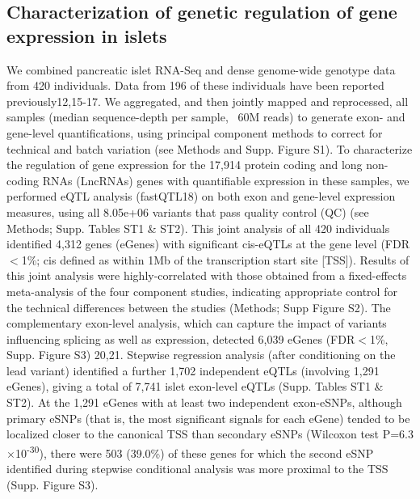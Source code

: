 \subsection{Characterization of genetic regulation of gene expression in islets}
We combined pancreatic islet RNA-Seq and dense genome-wide genotype data from 420 individuals. Data from 196 of these individuals have been reported previously12,15-17. We aggregated, and then jointly mapped and reprocessed, all samples (median sequence-depth per sample, ~60M reads) to generate exon- and gene-level quantifications, using principal component methods to correct for technical and batch variation (see Methods and Supp. Figure S1).
To characterize the regulation of gene expression for the 17,914 protein coding and long non-coding RNAs (LncRNAs) genes with quantifiable expression in these samples, we performed eQTL analysis (fastQTL18) on both exon and gene-level expression measures, using all 8.05e+06 variants that pass quality control (QC) (see Methods; Supp. Tables ST1 \& ST2). This joint analysis of all 420 individuals identified 4,312 genes (eGenes) with significant cis-eQTLs at the gene level (FDR$<$1\%; cis defined as within 1Mb of the transcription start site [TSS]). Results of this joint analysis were highly-correlated with those obtained from a fixed-effects meta-analysis of the four component studies, indicating appropriate control for the technical differences between the studies (Methods; Supp Figure S2). The complementary exon-level analysis, which can capture the impact of variants influencing splicing as well as expression, detected 6,039 eGenes (FDR$<$1\%, Supp. Figure S3) 20,21. Stepwise regression analysis (after conditioning on the lead variant) identified a further 1,702 independent eQTLs (involving 1,291 eGenes), giving a total of 7,741 islet exon-level eQTLs (Supp. Tables ST1 \& ST2). At the 1,291 eGenes with at least two independent exon-eSNPs, although primary eSNPs (that is, the most significant signals for each eGene) tended to be localized closer to the canonical TSS than secondary eSNPs (Wilcoxon test P=6.3$\times$10\textsuperscript{-30}), there were 503 (39.0\%) of these genes for which the second eSNP identified during stepwise conditional analysis was more proximal to the TSS (Supp. Figure S3).

